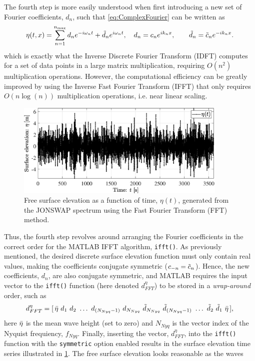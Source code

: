 The fourth step is more easily understood when first introducing a new set of Fourier coefficients, $d_n$, such that \cref{eq:ComplexFourier} can be written as
\begin{equation}
        \eta(t,x) = \sum_{n=1}^{n_{\text{max}}} d_n e^{-i\omega_n t} + \Tilde{d}_n e^{i\omega_n t}
    \label{eq:ComplexFourier2}, \quad d_n = c_n e^{ik_n x}, \qquad \Tilde{d}_n = \Tilde{c}_n e^{-ik_n x}.
\end{equation}
which is exactly what the Inverse Discrete Fourier Transform (IDFT) computes for a set of data points in a large matrix multiplication, requiring $O(n^2)$ multiplication operations. However, the computational efficiency can be greatly improved by using the Inverse Fast Fourier Transform (IFFT) that only requires $O(n\log{(n)})$ multiplication operations, i.e. near linear scaling.
\begin{figure}[htbp]
    \centering
    \includegraphics[width=0.9\textwidth]{Figures/Plots/SurfaceElevation.eps}
    \caption{Free surface elevation as a function of time, $\eta(t)$, generated from the JONSWAP spectrum using the Fast Fourier Transform (FFT) method.}
    \label{fig:SurfaceElevation}
\end{figure}

Thus, the fourth step revolves around arranging the Fourier coefficients in the correct order for the MATLAB IFFT algorithm, \verb+ifft()+. As previously mentioned, the desired discrete surface elevation function must only contain real values, making the coefficients conjugate symmetric ($c_{-n}=\Tilde{c}_n$). Hence, the new coefficients, $d_n$, are also conjugate symmetric, and MATLAB requires the input vector to the \verb+ifft()+ function (here denoted $d_{FFT}^\eta$) to be stored in a \textit{wrap-around} order, such as
\begin{equation}
    d_{FFT}^\eta = [\, \Bar{\eta}\ d_1\ d_2\ \dots \ d_{(N_{Nyq}-1)} \ d_{N_{Nyq}} \ \Tilde{d}_{N_{Nyq}} \ \Tilde{d}_{(N_{Nyq}-1)} \ \dots \  \Tilde{d}_2 \ \Tilde{d}_1 \ \Bar{\eta} \, ], 
    \label{eq:dfftvector}
\end{equation} 
here $\Bar{\eta}$ is the mean wave height (set to zero) and $N_{Nyq}$ is the vector index of the Nyquist frequiency, $f_{Nyq}$. Finally, inserting the vector, $d_{FFT}^\eta$, into the \verb+ifft()+ function with the \verb+symmetric+ option enabled results in the surface elevation time series illustrated in \cref{fig:SurfaceElevation}. The free surface elevation looks reasonable as the waves  
\\[15mm]


